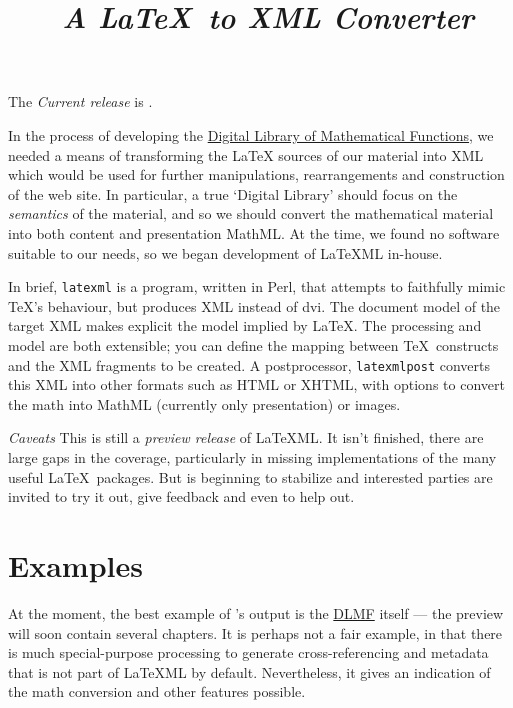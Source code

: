 \documentclass{article}
\title{\LaTeXML\ \emph{A \LaTeX\ to XML Converter}}
\newcommand{\current}{0.5.99}
\begin{document}
\maketitle

The \emph{Current release} is \htmlref{\current}{download}.

In the process of developing the
\href{http://dlmf.nist.gov/}{Digital Library of Mathematical Functions},
we needed a means of transforming
the LaTeX sources of our material into XML which would be used
for further manipulations, rearrangements and construction of the web site.
In particular, a true `Digital Library' should focus on the \emph{semantics}
of the material, and so we should convert the mathematical material into both
content and presentation MathML.
At the time, we found no software suitable to our needs, so we began
development of LaTeXML in-house.  

In brief, \texttt{latexml} is a program, written in Perl, that attempts to
faithfully mimic \TeX's behaviour, but produces XML instead of dvi.
The document model of the target XML makes explicit the model implied
by \LaTeX.
The processing and model are both extensible; you can define
the mapping between \TeX\ constructs and the XML fragments to be created.
A postprocessor, \texttt{latexmlpost} converts this
XML into other formats such as HTML or XHTML, with options
to convert the math into MathML (currently only presentation) or images.

\emph{Caveats} This is still a \emph{preview release} of LaTeXML.
It isn't finished, there are large gaps in the coverage,
particularly in missing implementations of the many useful \LaTeX\ packages.
But is beginning to stabilize and interested parties
are invited to try it out, give feedback and even to help out.


\section{Examples}\label{examples}
At the moment, the best example of \LaTeXML's output is 
the \href{http://dlmf.nist.gov/}{DLMF} itself
--- the preview  will soon contain several chapters.
It is perhaps not a fair example, in that there is much
special-purpose processing to generate cross-referencing and metadata that is not
part of LaTeXML by default. Nevertheless, it gives an indication of the
math conversion and other features possible.
\end{document}
